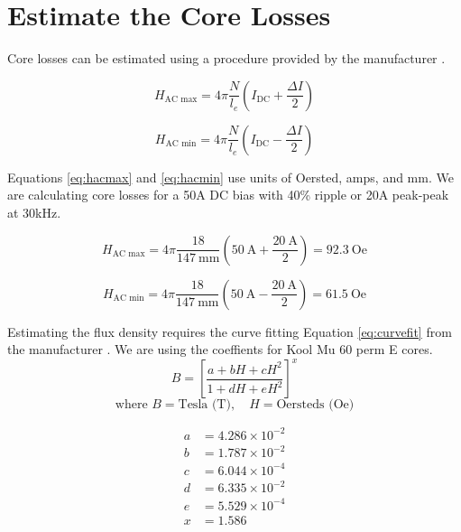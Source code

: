 \documentclass{article}
\begin{document}
\section{Estimate the Core Losses}
Core losses can be estimated using a procedure provided by the manufacturer \cite[p. 23]{magincPowderCat2024}.

\begin{equation}
\label{eq:hacmax}
    H_{\text{AC max}} = 4\pi \frac{N}{l_e} \left(I_{\text{DC}} + \frac{\Delta I}{2} \right)
\end{equation}

\begin{equation}
\label{eq:hacmin}
    H_{\text{AC min}} = 4\pi \frac{N}{l_e} \left(I_{\text{DC}} - \frac{\Delta I}{2} \right)
\end{equation}

Equations \eqref{eq:hacmax} and \eqref{eq:hacmin} use units of Oersted, amps, and mm.  We are calculating core losses for a 50A DC bias with 40\% ripple or 20A peak-peak at 30kHz.

\begin{equation}
    H_{\text{AC max}} = 4\pi \frac{\num{18}}{\SI{147}{\milli\meter}} \left(\SI{50}{\ampere} + \frac{\SI{20}{\ampere}}{2} \right) = \SI{92.3}{\text{Oe}}
\end{equation}

\begin{equation}
    H_{\text{AC min}} = 4\pi \frac{\num{18}}{\SI{147}{\milli\meter}} \left(\SI{50}{\ampere} - \frac{\SI{20}{\ampere}}{2} \right) = \SI{61.5}{\text{Oe}}
\end{equation}

Estimating the flux density requires the curve fitting Equation \eqref{eq:curvefit} from the manufacturer \cite[p. 123]{magincPowderCat2024}.  We are using the coeffients for Kool Mu 60 perm E cores.
\begin{equation}
\label{eq:curvefit}
B = \left[ \frac{a + bH + cH^2}{1 + dH + eH^2} \right]^x
\end{equation}
\[
\text{where } B = \text{Tesla (T)}, \quad H = \text{Oersteds (Oe)}
\]

\[
\begin{aligned}
    a &= 4.286 \times 10^{-2} \\
    b &= 1.787 \times 10^{-2} \\
    c &= 6.044 \times 10^{-4} \\
    d &= 6.335 \times 10^{-2} \\
    e &= 5.529 \times 10^{-4} \\
    x &= 1.586
\end{aligned}
\]
\end{document}
